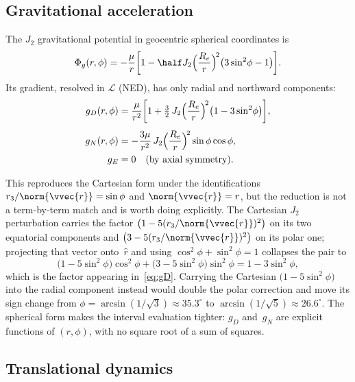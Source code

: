 \subsection{Gravitational acceleration}\label{sec:gravity}

The $J_2$ gravitational potential in geocentric spherical coordinates is
\[
  \Phi_g(r,\phi)
  = -\frac{\mu}{r}\biggl[
      1 - \half J_2\Bigl(\frac{R_e}{r}\Bigr)^{\!2}
          \bigl(3\sin^2\!\phi - 1\bigr)
    \biggr].
\]
Its gradient, resolved in $\mathcal{L}$ (NED), has only radial and
northward components:
\begin{align}
  g_D(r,\phi) &= \frac{\mu}{r^2}\biggl[
    1 + \tfrac{3}{2}\,J_2\Bigl(\frac{R_e}{r}\Bigr)^{\!2}
        \bigl(1-3\sin^2\!\phi\bigr)
  \biggr], \label{eq:gD}\\[4pt]
  g_N(r,\phi) &= -\frac{3\mu}{r^2}\,J_2
    \Bigl(\frac{R_e}{r}\Bigr)^{\!2}
    \sin\phi\cos\phi, \label{eq:gN}\\
  g_E &= 0\quad\text{(by axial symmetry)}.\nonumber
\end{align}

\begin{remark}\label{rem:gravity-spherical}
This reproduces the Cartesian form under the
identifications $r_3/\norm{\vvec{r}} = \sin\phi$ and
$\norm{\vvec{r}} = r$, but the reduction is not a term-by-term match and
is worth doing explicitly. The Cartesian $J_2$ perturbation carries the
factor $\bigl(1-5(r_3/\norm{\vvec{r}})^2\bigr)$ on its two equatorial
components and $\bigl(3-5(r_3/\norm{\vvec{r}})^2\bigr)$ on its polar one;
projecting that vector onto~$\hat{r}$ and using
$\cos^2\!\phi + \sin^2\!\phi = 1$ collapses the pair to
\[
  \bigl(1-5\sin^2\!\phi\bigr)\cos^2\!\phi
  + \bigl(3-5\sin^2\!\phi\bigr)\sin^2\!\phi
  = 1-3\sin^2\!\phi ,
\]
which is the factor appearing in~\cref{eq:gD}. Carrying the Cartesian
$\bigl(1-5\sin^2\!\phi\bigr)$ into the radial component instead would
double the polar correction and move its sign change from
$\phi = \arcsin(1/\sqrt{3}) \approx 35.3^\circ$ to
$\arcsin(1/\sqrt{5}) \approx 26.6^\circ$. The spherical form makes the
interval evaluation tighter: $g_D$ and~$g_N$ are explicit functions of
$(r,\phi)$, with no square root of a sum of squares.
\end{remark}


\subsection{Translational dynamics}\label{sec:trans-dyn}

